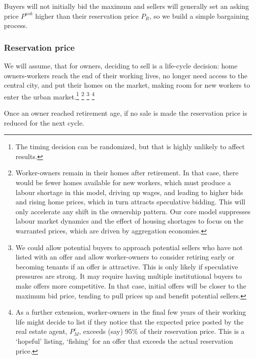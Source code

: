 Buyers will not initially bid the maximum and sellers will generally set an asking price $P^{ask}$ higher than their reservation price $P_R$, so we build a simple bargaining process.



\subsubsection{Reservation price} \label{section-reservation-price}

We will assume,  that for owners, deciding to sell is a life-cycle decision: home owners-workers  reach the end of their working lives, no longer need access to the central city, and put their homes on the market, making room for new workers to enter the urban market.\footnote{The timing decision can be randomized, but that is highly unlikely to affect results.} \footnote{Worker-owners remain in their homes after retirement. In that case,  there would be fewer homes available for new workers, which must produce a labour shortage in this model, driving up wages, and leading to higher bids and rising home prices, which in turn attracts  speculative bidding. This will only accelerate any shift in the ownership pattern. Our core model suppresses labour market dynamics and the effect of housing shortages to focus on the warranted prices, which are driven by aggregation economies.} 
\footnote{We could allow potential buyers  to approach potential sellers who have not listed with an offer and allow worker-owners to consider retiring early or becoming tenants if an offer is attractive.  This is only likely if speculative pressures are strong. It may require having multiple institutional buyers to make offers more competitive. In that case, initial offers will be closer to the maximum bid price, tending to pull prices up and benefit potential sellers.}  
\footnote{As a further  extension, worker-owners in the final few years of their working life might decide to  list if  they notice that the expected price posted by the real estate agent, $P_M^e$,  exceeds (say) 95\% of their reservation price. This is a `hopeful' listing, `fishing' for an offer that exceeds the actual reservation price.}


Once an owner reached retirement age, if no sale is made the reservation price is reduced for the next cycle.


